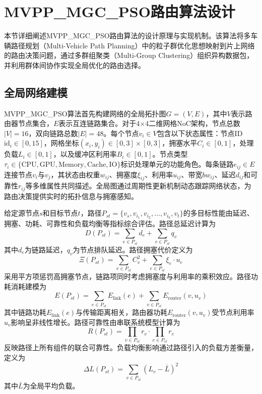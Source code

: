 \section{MVPP\_MGC\_PSO路由算法设计}

本节详细阐述MVPP\_MGC\_PSO路由算法的设计原理与实现机制。该算法将多车辆路径规划（Multi-Vehicle Path Planning）中的粒子群优化思想映射到片上网络的路由决策问题，通过多群组聚类（Multi-Group Clustering）组织异构数据包，并利用群体间协作实现全局优化的路由选择。

\subsection{全局网络建模}

MVPP\_MGC\_PSO算法首先构建网络的全局拓扑图$G = (V, E)$，其中$V$表示路由器节点集合，$E$表示互连链路集合。对于4$\times$4二维网格NoC架构，节点总数$|V| = 16$，双向链路总数$|E| = 48$。每个节点$v_i \in V$包含以下状态属性：节点ID $\text{id}_i \in [0, 15]$，网格坐标$(x_i, y_i) \in [0, 3] \times [0, 3]$，拥塞水平$C_i \in [0, 1]$，处理负载$L_i \in [0, 1]$，以及缓冲区利用率$B_i \in [0, 1]$。节点类型$\tau_i \in \{\text{CPU}, \text{GPU}, \text{Memory}, \text{Cache}, \text{IO}\}$标识处理单元的功能角色。每条链路$e_{ij} \in E$连接节点$v_i$与$v_j$，其状态由权重$w_{ij}$、拥塞度$\xi_{ij}$、利用率$u_{ij}$、带宽$bw_{ij}$、延迟$d_{ij}$和可靠性$r_{ij}$等多维属性共同描述。全局图通过周期性更新机制动态跟踪网络状态，为路由决策提供实时的拓扑信息与拥塞感知。

给定源节点$s$和目标节点$t$，路径$P_{st} = \{v_s, v_{i_1}, v_{i_2}, \ldots, v_{i_k}, v_t\}$的多目标性能由延迟、拥塞、功耗、可靠性和负载均衡等指标综合评估。路径总延迟计算为
\begin{equation}
D(P_{st}) = \sum_{e \in P_{st}} d_e + \sum_{v \in P_{st}} q_v
\end{equation}
其中$d_e$为链路延迟，$q_v$为节点排队延迟。路径拥塞代价定义为
\begin{equation}
\Xi(P_{st}) = \sum_{v \in P_{st}} C_v^2 + \sum_{e \in P_{st}} \xi_e \cdot u_e
\end{equation}
采用平方项惩罚高拥塞节点，链路项同时考虑拥塞度与利用率的乘积效应。路径功耗消耗建模为
\begin{equation}
E(P_{st}) = \sum_{e \in P_{st}} E_{\text{link}}(e) + \sum_{v \in P_{st}} E_{\text{router}}(v, u_v)
\end{equation}
其中链路功耗$E_{\text{link}}(e)$与传输距离相关，路由器功耗$E_{\text{router}}(v, u_v)$受节点利用率$u_v$影响呈非线性增长。路径可靠性由串联系统模型计算为
\begin{equation}
R(P_{st}) = \prod_{v \in P_{st}} r_v \cdot \prod_{e \in P_{st}} r_e
\end{equation}
反映路径上所有组件的联合可靠性。负载均衡影响通过路径引入的负载方差衡量，定义为
\begin{equation}
\Delta L(P_{st}) = \sum_{v \in P_{st}} (L_v - \bar{L})^2
\end{equation}
其中$\bar{L}$为全局平均负载。

